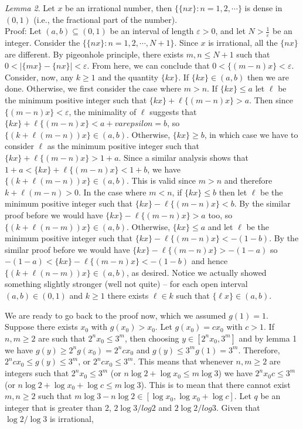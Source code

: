 \documentclass[11pt,a4paper]{article}
\newcommand{\<}{\langle}
\renewcommand{\>}{\rangle}
\begin{document}
\begin{enumerate}
	\emph{Lemma 2}. Let $x$ be an irrational number, then $\{\{nx\}: n = 1, 2, \cdots \}$ is dense in $(0, 1)$ (i.e., the fractional part of the number). \\
	Proof: Let $(a, b)\subseteq (0, 1)$ be an interval of length $\varepsilon>0$, and let $N>\frac{1}{\varepsilon}$ be an integer. 
	Consider the $\{\{nx\}: n = 1, 2, \cdots , N+1\}$. Since $x$ is irrational, all the $\{nx\}$ are different. By pigeonhole principle, there exists $m, n\le N+1$ such that $0<|\{mx\}-\{nx\}|<\varepsilon$. From here, we can conclude that $0<\{(m-n)x\}<\varepsilon$. 
	Consider, now, any $k\ge 1$ and the quantity $\{kx\}$. If $\{kx\}\in (a, b)$ then we are done. Otherwise, we first consider the case where $m>n$. If $\{kx\}\le a$ let $\ell$ be the minimum positive integer such that $\{kx\}+\ell\{(m-n)x\}>a$. Then since $\{(m-n)x\}<\varepsilon$, the minimality of $\ell$ suggests that $\{kx\}+\ell\{(m-n)x\}< a + varepsilon=b$, so $\{(k + \ell(m-n))x\}\in (a, b)$. 
	Otherwise, $\{kx\}\ge b$, in which case we have to consider $\ell$ as the minimum positive integer such that $\{kx\}+\ell\{(m-n)x\}> 1 + a$. Since a similar analysis shows that $1+a< \{kx\}+\ell\{(m-n)x\} < 1+b$, we have $\{(k + \ell(m-n))x\}\in (a, b)$. 
	This is valid since $m>n$ and therefore $k + \ell(m-n)>0$. 
	In the case where $m<n$, if $\{kx\}\le b$ then let $\ell$ be the minimum positive integer such that $\{kx\}-\ell\{(m-n)x\}<b$. By the similar proof before we would have $\{kx\}-\ell\{(m-n)x\} > a$ too, so $\{(k + \ell(n-m))x\}\in (a, b)$. 
	Otherwise, $\{kx\}\le a$ and let $\ell$ be the minimum positive integer such that $\{kx\}-\ell\{(m-n)x\} < -(1-b)$. By the similar proof before we would have $\{kx\}-\ell\{(m-n)x\} > -(1-a)$ so $-(1-a)<\{kx\}-\ell\{(m-n)x\} < -(1-b)$ and hence $\{(k + \ell(n-m))x\}\in (a, b)$, as desired. 
	Notice we actually showed something slightly stronger (well not quite) -- for each open interval $(a, b)\in (0, 1)$ and $k\ge 1$ there exists $\ell\in k$ such that $\{\ell x\}\in (a, b)$. 
	
	We are ready to go back to the proof now, which we assumed $g(1)=1$. Suppose there exists $x_0$ with $g(x_0)>x_0$. Let $g(x_0)=cx_0$ with $c>1$. If $n, m\ge 2$ are such that $2^nx_0\le 3^m$, then choosing $y\in [2^nx_0, 3^m]$ and by lemma 1 we have $g(y)\ge 2^ng(x_0)=2^ncx_0$ and $g(y)\le 3^mg(1)=3^m$. Therefore, $2^ncx_0\le g(y)\le 3^m$, or $2^ncx_0\le 3^m$. This means that whenever $n, m\ge 2$ are integers such that $2^nx_0\le 3^m$ (or $n\log 2 + \log x_0\le m\log 3$) we have $2^nx_0c\le 3^m$ (or $n\log 2 + \log x_0 + \log c \le m\log 3$). This is to mean that there cannot exist $m, n\ge 2$ such that $m\log 3 - n\log 2\in [\log x_0, \log x_0 + \log c]$. 
	Let $q$ be an integer that is greater than 2, $2\log 3/log 2$ and $2\log 2/log 3$. Given that $\log 2/\log 3$ is irrational, 
	

\end{enumerate}
\end{document}
